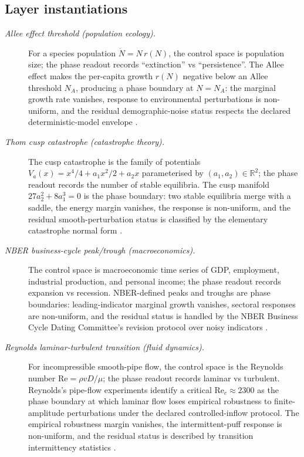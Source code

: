 \documentclass[11pt]{article}
\theoremstyle{definition}
\begin{document}
\subsection*{Layer instantiations}\label{layer-inst:F44}

\begin{description}
\item[\emph{Allee effect threshold (population
ecology).}]
For a species population \(\dot N=N\,r(N)\), the
control space is population size; the phase readout
records ``extinction'' vs ``persistence''.  The Allee
effect makes the per-capita growth \(r(N)\) negative
below an Allee threshold \(N_A\), producing a phase
boundary at \(N=N_A\): the marginal growth rate
vanishes, response to environmental perturbations is
non-uniform, and the residual demographic-noise
status respects the declared deterministic-model
envelope \citep{Allee1931Aggregations}.

\item[\emph{Thom cusp catastrophe (catastrophe
theory).}]
The cusp catastrophe is the family of potentials
\(V_a(x)=x^4/4+a_1 x^2/2+a_2 x\) parameterised by
\((a_1,a_2)\in\mathbb R^2\); the phase readout
records the number of stable equilibria.  The cusp
manifold \(27 a_2^2+8 a_1^3=0\) is the phase
boundary: two stable equilibria merge with a saddle,
the energy margin vanishes, the response is
non-uniform, and the residual smooth-perturbation
status is classified by the elementary catastrophe
normal form \citep{Thom1972Stabilite}.

\item[\emph{{NBER} business-cycle peak/trough
(macroeconomics).}]
The control space is macroeconomic time series of
GDP, employment, industrial production, and personal
income; the phase readout records expansion vs
recession.  NBER-defined peaks and troughs are
phase boundaries: leading-indicator marginal growth
vanishes, sectoral responses are non-uniform, and
the residual status is handled by the NBER Business
Cycle Dating Committee's revision protocol over
noisy indicators \citep{BurnsMitchell1946Measuring}.

\item[\emph{Reynolds laminar-turbulent transition
(fluid dynamics).}]
For incompressible smooth-pipe flow, the control
space is the Reynolds number
\(\mathrm{Re}=\rho v D/\mu\); the phase readout
records laminar vs turbulent.  Reynolds's pipe-flow
experiments identify a critical
\(\mathrm{Re}_c\approx 2300\) as the phase
boundary at which laminar flow loses empirical
robustness to finite-amplitude perturbations under
the declared controlled-inflow protocol.  The
empirical robustness margin vanishes, the
intermittent-puff response is non-uniform, and the
residual status is described by transition
intermittency statistics
\citep{Reynolds1883Turbulent}.


\end{description}
\end{document}
